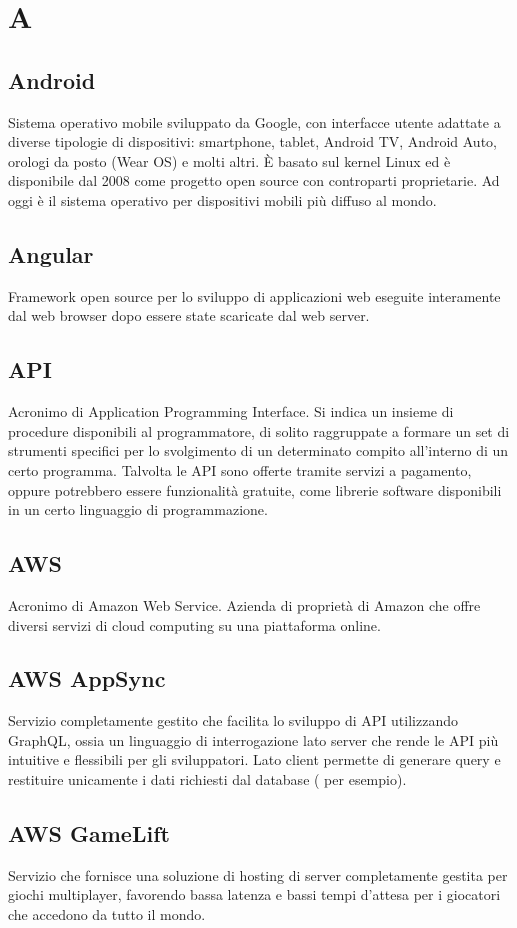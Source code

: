 \section*{A}
\markright{}
\subsection*{Android}
Sistema operativo mobile sviluppato da Google, con interfacce utente adattate a diverse tipologie di dispositivi: smartphone, tablet, Android TV, Android Auto, orologi da posto (Wear OS) e molti altri. È basato sul kernel Linux ed è disponibile dal 2008 come progetto open source con controparti proprietarie. Ad oggi è il sistema operativo per dispositivi mobili più diffuso al mondo.
\subsection*{Angular}
Framework open source per lo sviluppo di applicazioni web eseguite interamente dal web browser dopo essere state scaricate dal web server.
\subsection*{API}
Acronimo di Application Programming Interface. Si indica un  insieme  di  procedure disponibili al programmatore, di solito  raggruppate a formare un set di strumenti specifici per lo svolgimento di un determinato compito all’interno di un certo programma. Talvolta le API sono offerte tramite servizi a pagamento, oppure potrebbero essere funzionalità gratuite, come librerie software disponibili in un certo linguaggio di programmazione.
\subsection*{AWS}
Acronimo di Amazon Web Service. Azienda di proprietà di Amazon che offre diversi servizi di cloud computing su una piattaforma online.
\subsection*{AWS AppSync}
Servizio  completamente gestito che facilita lo sviluppo di API utilizzando GraphQL, ossia un linguaggio di interrogazione lato server che rende le API più intuitive e flessibili per gli sviluppatori. Lato client permette di generare query e restituire unicamente i dati richiesti dal database ( per esempio).  
\subsection*{AWS GameLift}
Servizio  che fornisce una soluzione di hosting di server completamente gestita per giochi multiplayer, favorendo bassa latenza e bassi tempi d'attesa per i giocatori che accedono da tutto il mondo.  

